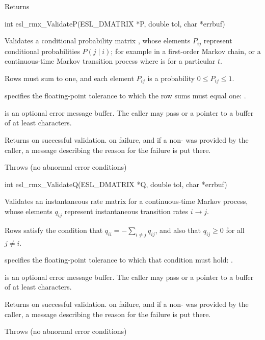 \begin{sreapi}
Returns  



\hypertarget{func:esl_rmx_ValidateP()}
{\item[int esl\_rmx\_ValidateP(ESL\_DMATRIX *P, double tol, char *errbuf)]}

Validates a conditional probability matrix , whose
elements $P_{ij}$ represent conditional probabilities
$P(j \mid i)$; for example in a first-order Markov
chain, or a continuous-time Markov transition process
where  is for a particular $t$.

Rows must sum to one, and each element $P_{ij}$ is a
probability $0 \leq P_{ij} \leq 1$.

 specifies the floating-point tolerance to which
the row sums must equal one: .

 is an optional error message buffer. The caller
may pass  or a pointer to a buffer of at least
 characters.

Returns  on successful validation. 
 on failure, and if a non-  was
provided by the caller, a message describing
the reason for the failure is put there.

Throws (no abnormal error conditions)


\hypertarget{func:esl_rmx_ValidateQ()}
{\item[int esl\_rmx\_ValidateQ(ESL\_DMATRIX *Q, double tol, char *errbuf)]}

Validates an instantaneous rate matrix  for a
continuous-time Markov process, whose elements $q_{ij}$
represent instantaneous transition rates $i \rightarrow
j$. 

Rows satisfy the condition that
$q_{ii} = -\sum_{i \neq j} q_{ij}$, and also
that $q_{ij} \geq 0$ for all $j \neq i$. 

 specifies the floating-point tolerance to which
that condition must hold: .

 is an optional error message buffer. The caller
may pass  or a pointer to a buffer of at least
 characters.

Returns  on successful validation. 
 on failure, and if a non-  was
provided by the caller, a message describing
the reason for the failure is put there.

Throws (no abnormal error conditions)



\end{sreapi}
